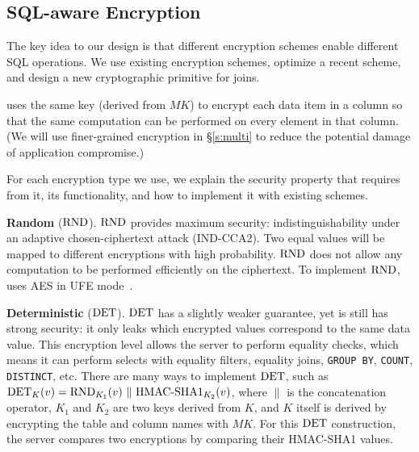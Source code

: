 
\subsection{SQL-aware Encryption}
\label{ss:sqlaware}

The key idea to our design is that different encryption schemes enable
different SQL operations.  We use existing encryption schemes, optimize
a recent scheme, and design a new cryptographic primitive for joins.

\name{} uses the same key (derived from $\mathit{MK}$) to encrypt each  data item in a column so that the same computation can be performed on every
element in that column. (We will
  use finer-grained encryption in \S\ref{s:multi} to reduce the
  potential damage of application compromise.)

For each encryption type we use, we explain the security property that
\name{} requires from it, its functionality, and how to implement it with existing schemes. 
 
\textbf{Random} ($\textrm{RND}$)\@. $\textrm{RND}$ provides maximum security:
indistinguishability under an adaptive chosen-ciphertext attack
(IND-CCA2).  Two equal values will be
mapped to different encryptions with high probability. $\textrm{RND}$ does not
allow any computation to be performed efficiently on the ciphertext.
To implement $\textrm{RND}$, \name{} uses AES in UFE mode~\cite{desai:ufe}.

\textbf{Deterministic} ($\textrm{DET}$)\@. $\textrm{DET}$ has a slightly weaker
guarantee, yet is still has strong security: it only leaks which encrypted values correspond to the same
data value. This encryption level allows the server to perform
equality checks, which means it can perform selects with equality
filters, equality joins, {\tt GROUP BY}, {\tt COUNT}, {\tt DISTINCT},
etc.  There are
many ways to implement $\textrm{DET}$, such as $\textrm{DET}_K(v)=\textrm{RND}_{K_1}(v) ~ \| ~
\textrm{HMAC-SHA1}_{K_2}(v)$, where $\|$ is the
concatenation operator, $K_1$ and $K_2$ are two keys derived from $K$,
and $K$ itself is derived by encrypting the table and column names
with $\mathit{MK}$\@.  For this $\textrm{DET}$ construction, the server compares two
encryptions by comparing their HMAC-SHA1
values.

